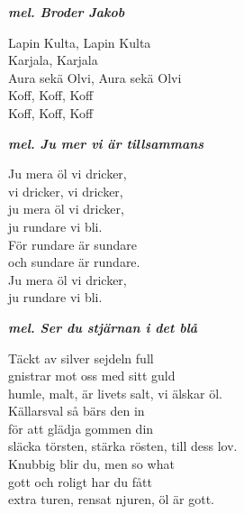 \documentclass[a6paper,10pt]{article}
\newcommand{\mel}[1]{\small\textbf{\textit{mel. #1 \\}}}
\begin{document}
\setlength{\oddsidemargin}{-0.47in}
\begin{center}
    \mel{Broder Jakob}
\end{center}
\begin{lyrics}
Lapin Kulta, Lapin Kulta\\
Karjala, Karjala\\
Aura sekä Olvi, Aura sekä Olvi\\
Koff, Koff, Koff\\
Koff, Koff, Koff
\end{lyrics}
\begin{center}
    \mel{Ju mer vi är tillsammans}
\end{center}
\begin{lyrics}
Ju mera öl vi dricker,\\
vi dricker, vi dricker,\\
ju mera öl vi dricker,\\
ju rundare vi bli.
\vspace{5pt} \\
För rundare är sundare\\
och sundare är rundare.\\
Ju mera öl vi dricker,\\
ju rundare vi bli.
\end{lyrics}
\begin{center}
    \mel{Ser du stjärnan i det blå}
\end{center}
\begin{lyrics}
Täckt av silver sejdeln full\\
gnistrar mot oss med sitt guld\\
humle, malt, är livets salt, vi älskar öl. 
\vspace{5pt}\\
Källarsval så bärs den in\\
för att glädja gommen din\\
släcka törsten, stärka rösten, till dess lov. 
\vspace{5pt}\\
Knubbig blir du, men so what\\
gott och roligt har du fått\\
extra turen, rensat njuren, öl är gott.
\end{lyrics}
\end{document}
